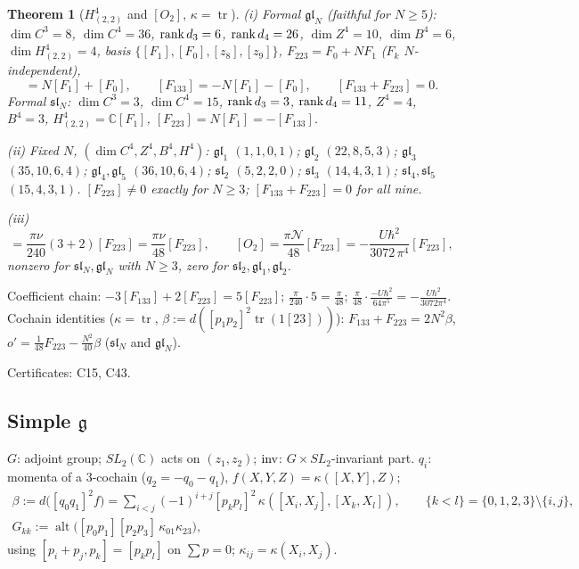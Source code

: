 \documentclass[10pt,a4paper]{article}
\numberwithin{equation}{section}
\newtheorem{theorem}{Theorem}[section]
\theoremstyle{definition}
\theoremstyle{remark}
\newcommand{\tr}{\operatorname{tr}}
\newcommand{\alt}{\operatorname{alt}}
\newcommand{\g}{\mathfrak g}
\newcommand{\fsl}{\mathfrak{sl}}
\newcommand{\fgl}{\mathfrak{gl}}
\newcommand{\cN}{\mathcal N}
\newcommand{\cert}[1]{\par\noindent\textup{Certificates: #1.}\par}
\begin{document}
\begin{theorem}[$H^4_{(2,2)}$ and {$[O_2]$}, $\kappa=\tr$]\label{thm-class-slN}
(i) Formal $\fgl_N$ (faithful for $N\ge5$): $\dim C^3=8$, $\dim C^4=36$, ${\rm rank}\,d_3=6$, ${\rm rank}\,d_4=26$, $\dim Z^4=10$, $\dim B^4=6$, $\dim H^4_{(2,2)}=4$, basis $\{[F_1],[F_0],[z_8],[z_9]\}$, $F_{223}=F_0+NF_1$ ($F_k$ $N$-independent),
\begin{equation}
[F_{223}]=N[F_1]+[F_0],\qquad [F_{133}]=-N[F_1]-[F_0],\qquad [F_{133}+F_{223}]=0 .
\end{equation}
Formal $\fsl_N$: $\dim C^3=3$, $\dim C^4=15$, ${\rm rank}\,d_3=3$, ${\rm rank}\,d_4=11$, $Z^4=4$, $B^4=3$, $H^4_{(2,2)}=\mathbb C[F_1]$, $[F_{223}]=N[F_1]=-[F_{133}]$.

(ii) Fixed $N$, $(\dim C^4,Z^4,B^4,H^4)$: $\fgl_1$ $(1,1,0,1)$; $\fgl_2$ $(22,8,5,3)$; $\fgl_3$ $(35,10,6,4)$; $\fgl_4,\fgl_5$ $(36,10,6,4)$; $\fsl_2$ $(5,2,2,0)$; $\fsl_3$ $(14,4,3,1)$; $\fsl_4,\fsl_5$ $(15,4,3,1)$. $[F_{223}]\neq0$ exactly for $N\ge3$; $[F_{133}+F_{223}]=0$ for all nine.

(iii)
\begin{equation}
[o_2]=\frac{\pi\nu}{240}(3+2)[F_{223}]=\frac{\pi\nu}{48}[F_{223}],\qquad [O_2]=\frac{\pi\cN}{48}[F_{223}]=-\frac{U\hbar^2}{3072\,\pi^4}[F_{223}],
\end{equation}
nonzero for $\fsl_N,\fgl_N$ with $N\ge3$, zero for $\fsl_2,\fgl_1,\fgl_2$.
\end{theorem}
Coefficient chain: $-3[F_{133}]+2[F_{223}]=5[F_{223}]$; $\frac{\pi}{240}\cdot5=\frac\pi{48}$; $\frac{\pi}{48}\cdot\frac{-U\hbar^2}{64\pi^5}=-\frac{U\hbar^2}{3072\pi^4}$. Cochain identities ($\kappa=\tr$, $\beta:=d([p_1p_2]^2\tr(1[23]))$): $F_{133}+F_{223}=2N^2\beta$, $o'=\frac1{48}F_{223}-\frac{N^2}{40}\beta$ ($\fsl_N$ and $\fgl_N$).
\cert{C15, C43}

\subsection{\texorpdfstring{Simple $\g$}{Simple g}}\label{sec-simple}

$G$: adjoint group; $SL_2(\mathbb C)$ acts on $(z_1,z_2)$; ${\rm inv}$: $G\times SL_2$-invariant part. $q_i$: momenta of a 3-cochain ($q_2=-q_0-q_1$), $f(X,Y,Z)=\kappa([X,Y],Z)$;
\begin{equation}
\begin{gathered}
\beta:=d\big([q_0q_1]^2f\big)=\sum_{i<j}(-1)^{i+j}[p_kp_l]^2\,\kappa([X_i,X_j],[X_k,X_l]),\qquad\{k<l\}=\{0,1,2,3\}\setminus\{i,j\},\\
G_{kk}:=\alt\big([p_0p_1][p_2p_3]\,\kappa_{01}\kappa_{23}\big),
\end{gathered}
\end{equation}
using $[p_i+p_j,p_k]=[p_kp_l]$ on $\sum p=0$; $\kappa_{ij}=\kappa(X_i,X_j)$.
\end{document}
